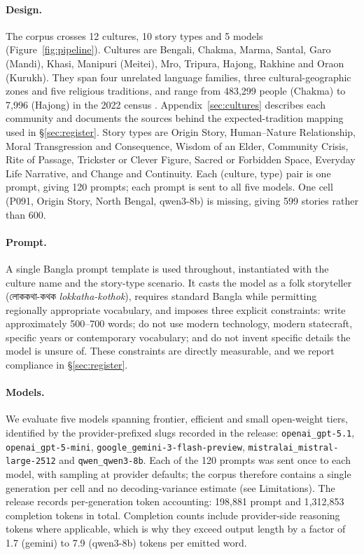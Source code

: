 \documentclass[11pt]{article}
\newcommand{\bn}[1]{{\bnfont #1}}
\begin{document}
\paragraph{Design.}
The corpus crosses 12 cultures, 10 story types and 5 models
(Figure~\ref{fig:pipeline}). Cultures are
Bengali, Chakma, Marma, Santal, Garo (Mandi), Khasi, Manipuri (Meitei), Mro,
Tripura, Hajong, Rakhine and Oraon (Kurukh). They span four unrelated
language families, three cultural-geographic zones and five religious
traditions, and range from 483{,}299 people (Chakma) to 7{,}996 (Hajong) in
the 2022 census \cite{bbs2022census}. Appendix~\ref{sec:cultures} describes
each community and documents the sources behind the expected-tradition
mapping used in \S\ref{sec:register}. Story types are Origin Story,
Human--Nature Relationship, Moral Transgression and Consequence, Wisdom of an
Elder, Community Crisis, Rite of Passage, Trickster or Clever Figure, Sacred or
Forbidden Space, Everyday Life Narrative, and Change and Continuity. Each
(culture, type) pair is one prompt, giving 120 prompts; each prompt is sent to
all five models. One cell (P091, Origin Story, North Bengal, qwen3-8b) is
missing, giving 599 stories rather than 600.

\paragraph{Prompt.}
A single Bangla prompt template is used throughout, instantiated with the
culture name and the story-type scenario. It casts the model as a folk
storyteller (\bn{লোককথা-কথক} \textit{lokkatha-kothok}), requires standard Bangla while permitting
regionally appropriate vocabulary, and imposes three explicit constraints:
write approximately 500--700 words; do not use modern technology, modern
statecraft, specific years or contemporary vocabulary; and do not invent
specific details the model is unsure of. These constraints are directly
measurable, and we report compliance in \S\ref{sec:register}.

\paragraph{Models.}
We evaluate five models spanning frontier, efficient and small open-weight
tiers, identified by the provider-prefixed slugs recorded in the release:
\texttt{openai\_gpt-5.1}, \texttt{openai\_gpt-5-mini},
\texttt{google\_gemini-3-flash-preview},
\texttt{mistralai\_mistral-large-2512} and \texttt{qwen\_qwen3-8b}. Each of the
120 prompts was sent once to each model, with sampling at provider defaults;
the corpus therefore contains a single generation per cell and no
decoding-variance estimate (see Limitations). The release records per-generation
token accounting: 198{,}881 prompt and 1{,}312{,}853 completion tokens in total.
Completion counts include provider-side reasoning tokens where applicable, which
is why they exceed output length by a factor of 1.7 (gemini) to 7.9 (qwen3-8b)
tokens per emitted word.
\end{document}

